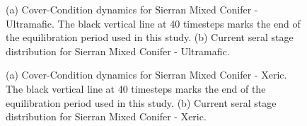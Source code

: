 \begin{figure}[!htbp]
  \centering
  \caption{(a) Cover-Condition dynamics for Sierran Mixed Conifer - Ultramafic. The black vertical line at 40 timesteps marks the end of the equilibration period used in this study. (b) Current seral stage distribution for Sierran Mixed Conifer - Ultramafic.} 
  \label{fig:covcond_smcu}
\end{figure}

\begin{figure}[!htbp]
  \centering
  \caption{(a) Cover-Condition dynamics for Sierran Mixed Conifer - Xeric. The black vertical line at 40 timesteps marks the end of the equilibration period used in this study. (b) Current seral stage distribution for Sierran Mixed Conifer - Xeric.} 
  \label{fig:covcond_smcx}
\end{figure}




